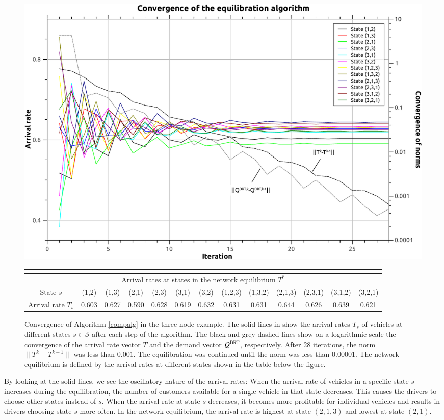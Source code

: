 \documentclass[dissertation,draft*]{aaltoseries}
\begin{document}
\begin{figure}[ht]
\begin{center}
\includegraphics[width=0.9\columnwidth]{convergence01}
{\tiny
\begin{tabular}{|c|cccccccccccc|}
\multicolumn{13}{c}{} \\
\hline
\multicolumn{13}{|c|}{Arrival rates at states in the network equilibrium $T^*$} \\
\hline
State $s$ & (1,2) & (1,3) & (2,1) & (2,3) & (3,1) & (3,2) & (1,2,3) & (1,3,2) & (2,1,3) & (2,3,1) & (3,1,2) & (3,2,1) \\
\hline
Arrival rate $T_s$ & 0.603 & 0.627 & 0.590 & 0.628 & 0.619 & 0.632 & 0.631 & 0.631 & 0.644 & 0.626 & 0.639 & 0.621 \\
\hline
\end{tabular}
}
\caption{Convergence of Algorithm \ref{compalg} in the three node example. The solid lines in show the
arrival rates $T_s$ of vehicles at different states $s \in \mathcal{S}$ after each step of the algorithm. 
The black and grey dashed lines show on a logarithmic scale 
the convergence of the arrival rate vector $T$ and the demand vector $Q^{\rm DRT}$, respectively.
After 28 iterations, the norm $\|T^k - T^{k-1}\|$ was less than $0.001$. The equilibration was continued 
until the norm was less than $0.00001$. The network equilibrium is defined by the
arrival rates at different states shown in the table below the figure.}
\label{convergence01}
\end{center}
\end{figure}

By looking at the solid lines, we see the oscillatory nature of the arrival rates: When the
arrival rate of vehicles in a specific state $s$ increases during the equilibration, the number 
of customers available for a single vehicle in that state decreases. 
This causes the drivers to choose other states instead of $s$.
When the arrival rate at state $s$ decreases, it becomes more profitable for individual vehicles
and results in drivers choosing state $s$ more often. In the network equilibrium, the arrival rate is highest
at state $(2,1,3)$ and lowest at state $(2,1)$.
\end{document}
